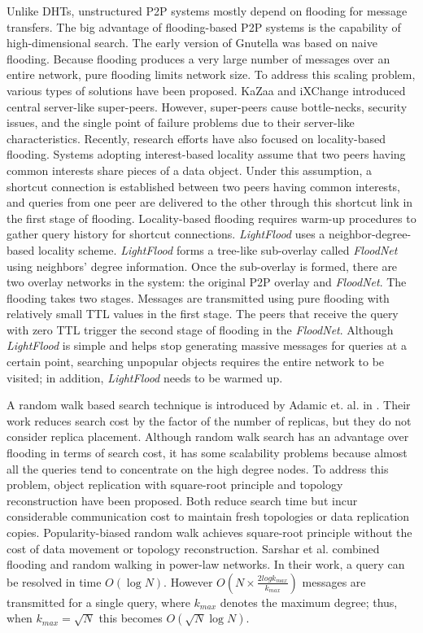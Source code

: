 \documentclass[conference]{IEEEtran}
\begin{document}
Unlike DHTs, unstructured P2P systems mostly depend on flooding 
for message transfers. The big advantage of flooding-based P2P systems 
is the capability of high-dimensional search.
The early version of Gnutella was based on naive
flooding. Because flooding produces a very large number of
messages over an entire 
network, pure flooding limits network size. 
To address this scaling problem, various types of solutions have been 
proposed. KaZaa\cite{kazaa} and iXChange
\cite{JohnstoneSM05} introduced central server-like super-peers. 
However, super-peers cause bottle-necks, security issues, and the single 
point of failure problems due to their server-like characteristics. 
Recently, research efforts have also focused on locality-based flooding. Systems 
adopting interest-based locality\cite{Guo04,Guo05,SMZ03} assume that 
two peers having common interests share pieces of a data object. 
Under this assumption, a shortcut 
connection is established between two peers having common interests, 
and queries from one peer are delivered to the other through this 
shortcut link in the first stage of flooding. 
Locality-based flooding requires warm-up procedures to gather query 
history for shortcut connections. 
\textit{LightFlood}\cite{JiangGZW08} uses 
a neighbor-degree-based locality scheme. 
\textit{LightFlood} forms a tree-like sub-overlay called 
\textit{FloodNet} using neighbors' degree information. Once the sub-overlay 
is formed, there are two overlay networks in the system: the original 
P2P overlay and \textit{FloodNet}. The flooding takes two stages.
Messages are transmitted using pure flooding with relatively small TTL values 
in the first stage. The peers that receive the query with zero TTL trigger 
the second stage of flooding in the \textit{FloodNet}. Although 
\textit{LightFlood} is simple and helps stop generating massive messages 
for queries at a certain point, searching unpopular objects requires  
the entire network to be visited; in addition, \textit{LightFlood} needs to 
be warmed up.  

A random walk based search technique is introduced by Adamic et. al. 
in \cite{alph:powerlaw01}. 
Their work reduces search cost by the factor of the number of replicas, 
but they do not consider replica placement. 
Although random walk search has an advantage over flooding
in terms of search cost, it has some
scalability problems because almost all the queries tend to concentrate
on the high degree nodes. To address this problem, object
replication with square-root principle\cite{CohenS02,LCKS02}
and topology reconstruction\cite{Cooper05} have been proposed. 
Both reduce search time but incur considerable communication cost 
to maintain fresh topologies or data replication copies. 
Popularity-biased random walk\cite{zs:popularity06}
achieves square-root principle without the cost of data movement or
topology reconstruction. Sarshar et al. \cite{ns:percolation}
combined flooding and random walking in power-law networks. In their
work, a query can be resolved in time $O(\log N)$. However
$O(N\times \frac{2log k_{max}}{k_{max}})$ messages are
transmitted for a single query, where $k_{max}$ denotes the maximum
degree; thus, when $k_{max} = \sqrt{N}$ this becomes $O(\sqrt N \log N)$.
\end{document}
